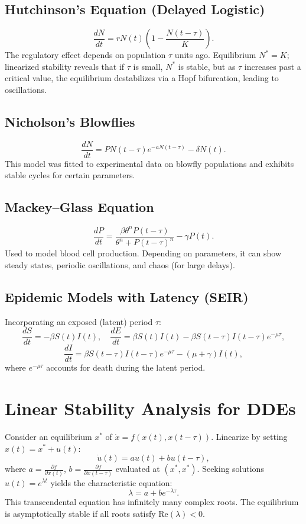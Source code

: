 \documentclass[12pt,a4paper]{book}
\begin{document}
\subsection{Hutchinson’s Equation (Delayed Logistic)}
\[
\frac{dN}{dt} = r N(t) \left(1 - \frac{N(t-\tau)}{K}\right).
\]
The regulatory effect depends on population $\tau$ units ago. Equilibrium $N^*=K$; linearized stability reveals that if $\tau$ is small, $N^*$ is stable, but as $\tau$ increases past a critical value, the equilibrium destabilizes via a Hopf bifurcation, leading to oscillations.

\subsection{Nicholson’s Blowflies}
\[
\frac{dN}{dt} = P N(t-\tau) e^{-a N(t-\tau)} - \delta N(t).
\]
This model was fitted to experimental data on blowfly populations and exhibits stable cycles for certain parameters.

\subsection{Mackey–Glass Equation}
\[
\frac{dP}{dt} = \frac{\beta \theta^n P(t-\tau)}{\theta^n + P(t-\tau)^n} - \gamma P(t).
\]
Used to model blood cell production. Depending on parameters, it can show steady states, periodic oscillations, and chaos (for large delays).

\subsection{Epidemic Models with Latency (SEIR)}
Incorporating an exposed (latent) period $\tau$:
\[
\frac{dS}{dt} = -\beta S(t) I(t),\quad
\frac{dE}{dt} = \beta S(t) I(t) - \beta S(t-\tau) I(t-\tau) e^{-\mu \tau},
\]
\[
\frac{dI}{dt} = \beta S(t-\tau) I(t-\tau) e^{-\mu \tau} - (\mu+\gamma) I(t),
\]
where $e^{-\mu\tau}$ accounts for death during the latent period.

\section{Linear Stability Analysis for DDEs}
Consider an equilibrium $x^*$ of $\dot{x} = f(x(t), x(t-\tau))$. Linearize by setting $x(t) = x^* + u(t)$:
\[
\dot{u}(t) = a u(t) + b u(t-\tau),
\]
where $a = \frac{\partial f}{\partial x(t)}$, $b = \frac{\partial f}{\partial x(t-\tau)}$ evaluated at $(x^*,x^*)$. Seeking solutions $u(t) = e^{\lambda t}$ yields the characteristic equation:
\[
\lambda = a + b e^{-\lambda \tau}.
\]
This transcendental equation has infinitely many complex roots. The equilibrium is asymptotically stable if all roots satisfy $\text{Re}(\lambda) < 0$.
\end{document}
